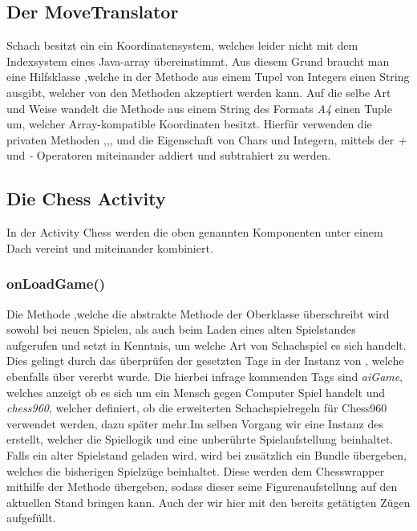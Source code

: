 \subsection{Der MoveTranslator}
Schach besitzt ein ein Koordinatensystem, welches leider nicht mit dem 
Indexsystem eines Java-array übereinstimmt. Aus diesem Grund braucht man eine 
Hilfsklasse ,welche in der Methode  aus 
einem Tupel von Integers einen String ausgibt, welcher von den 
 Methoden akzeptiert werden kann. Auf die selbe Art und Weise 
wandelt die Methode  aus einem String des Formats \emph{A4} 
einen Tuple um, welcher Array-kompatible Koordinaten besitzt. Hierfür verwenden 
die privaten Methoden ,,, und 
 die Eigenschaft von Chars und Integern, mittels der \emph{+}
und \emph{-} Operatoren miteinander addiert und subtrahiert zu werden.


\subsection{Die Chess Activity}

In der Activity Chess werden die oben genannten Komponenten unter einem Dach 
vereint und miteinander kombiniert.

\subsubsection{onLoadGame()}

Die Methode ,welche die abstrakte Methode der Oberklasse
 überschreibt wird sowohl bei neuen Spielen, als auch beim
Laden eines alten Spielstandes aufgerufen und setzt in Kenntnis, um welche Art
von Schachspiel es sich handelt. Dies gelingt durch das überprüfen der gesetzten
Tags in der Instanz von , welche ebenfalls über 
vererbt wurde. Die hierbei infrage kommenden Tags sind \emph{aiGame}, welches
anzeigt ob es sich um ein Mensch gegen Computer Spiel handelt und
\emph{chess960}, welcher definiert, ob die erweiterten Schachspielregeln für
Chess960 verwendet werden, dazu später mehr.\newline Im selben Vorgang wir eine
Instanz des  erstellt, welcher die Spiellogik und eine
unberührte Spielaufstellung beinhaltet. Falls ein alter Spielstand geladen wird,
wird bei  zusätzlich ein Bundle übergeben, welches die
bisherigen Spielzüge beinhaltet. Diese werden dem Chesswrapper mithilfe der
Methode  übergeben, sodass dieser seine Figurenaufstellung auf
den aktuellen Stand bringen kann. Auch der  wir hier
mit den bereits getätigten Zügen aufgefüllt.

